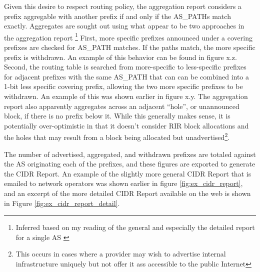 Given this desire to respect routing policy, the aggregation report considers a
prefix aggregable with another prefix if and only if the AS\_PATHs match
exactly. Aggregates are sought out using what appear to be two approaches in
the aggregation report \footnote{Inferred based on my reading of the general
and especially the detailed report for a single AS \cite{cidr-report-details}}
First, more specific prefixes announced under a covering prefixes are checked
for AS\_PATH matches. If the paths match, the more specific prefix is
withdrawn. An example of this behavior can be found in figure x.z. Second,
the routing table is searched from more-specific to less-specific prefixes
for adjacent prefixes with the same AS\_PATH that can can be combined into
a 1-bit less specific covering prefix, allowing the two more specific
prefixes to be withdrawn. An example of this was shown earlier in
figure x.y. The aggregation report also apparently aggregates across an
adjacent ``hole'', or unannounced block, if there is no prefix below
it. While this generally makes sense, it is potentially over-optimistic
in that it doesn't consider RIR block allocations and the holes that
may result from a block being allocated but unadvertised\footnote{This
occurs in cases where a provider may wish to advertise internal
infrastructure uniquely but not offer it ass accessible to the public
Internet}.

The number of advertised, aggregated, and withdrawn prefixes are totaled
against the AS originating each of the prefixes, and these figures are exported
to generate the CIDR Report. An example of the slightly more general CIDR
Report that is emailed to network operators was shown earlier in figure
\ref{fig:ex_cidr_report}, and an excerpt of the more detailed CIDR Report
available on the web is shown in Figure \ref{fig:ex_cidr_report_detail}.

